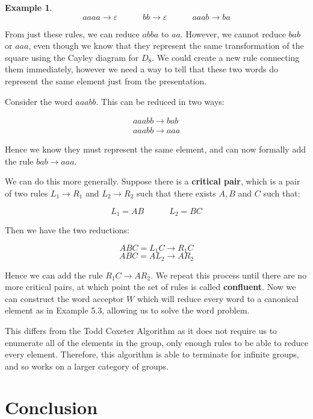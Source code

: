 \documentclass[10pt]{article}
\theoremstyle{plain}
\theoremstyle{definition}
\newtheorem{example}[theorem]{Example}
\theoremstyle{definition}
\theoremstyle{definition}
\begin{document}
\begin{multicols}{2}
\begin{example}
	\begin{equation*}
		aaaa \to \varepsilon \hspace{3em}
		bb \to \varepsilon \hspace{3em}
		aaab \to ba
	\end{equation*}	

	From just these rules, we can reduce $abba$ to $aa$. However, we cannot reduce $bab$ or $aaa$, even though we know that they represent the same transformation of the square using the Cayley diagram for $D_8$. We could create a new rule connecting them immediately, however we need a way to tell that these two words do represent the same element just from the presentation.

	Consider the word $aaabb$. This can be reduced in two ways:

	\begin{gather*}
		aaabb \to bab \\
		aaabb \to aaa
	\end{gather*}

	Hence we know they must represent the same element, and can now formally add the rule $bab \to aaa$. 
\end{example}

We can do this more generally. Suppose there is a \textbf{critical pair}, which is a pair of two rules $L_1 \to R_1$ and $L_2 \to R_2$ such that there exists $A, B$ and $C$ such that:

$$ L_1 = AB \hspace{3em} L_2 = BC $$

Then we have the two reductions:

$$ ABC = L_1 C \to R_1 C $$
$$ ABC = AL_2 \to A R_2 $$

Hence we can add the rule $R_1 C \to A R_2 $. We repeat this process until there are no more critical pairs, at which point the set of rules is called \textbf{confluent}. Now we can construct the word acceptor $W$ which will reduce every word to a canonical element as in Example 5.3, allowing us to solve the word problem.

This differs from the Todd Coxeter Algorithm as it does not require us to enumerate all of the elements in the group, only enough rules to be able to reduce every element. Therefore, this algorithm is able to terminate for infinite groups, and so works on a larger category of groups.



\section{Conclusion}


\end{multicols}
\end{document}
